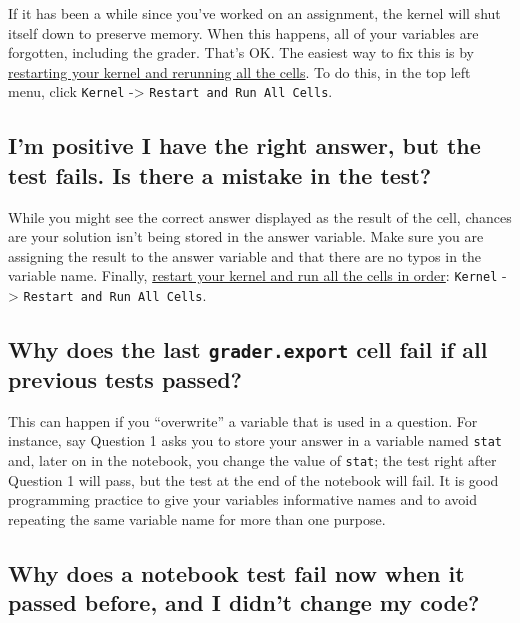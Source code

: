 \documentclass[
  letterpaper,
  DIV=11,
  numbers=noendperiod]{scrreprt}
\begin{document}
If it has been a while since you've worked on an assignment, the kernel
will shut itself down to preserve memory. When this happens, all of your
variables are forgotten, including the grader. That's OK. The easiest
way to fix this is by
\href{https://ds100.org/debugging-guide/jupyter101/jupyter101.html\#restarting-kernel}{restarting
your kernel and rerunning all the cells}. To do this, in the top left
menu, click \texttt{Kernel} -\textgreater{}
\texttt{Restart\ and\ Run\ All\ Cells}.

\subsection{I'm positive I have the right answer, but the test fails. Is
there a mistake in the
test?}\label{im-positive-i-have-the-right-answer-but-the-test-fails.-is-there-a-mistake-in-the-test}

While you might see the correct answer displayed as the result of the
cell, chances are your solution isn't being stored in the answer
variable. Make sure you are assigning the result to the answer variable
and that there are no typos in the variable name. Finally,
\href{https://ds100.org/debugging-guide/jupyter101/jupyter101.html\#restarting-kernel}{restart
your kernel and run all the cells in order}: \texttt{Kernel}
-\textgreater{} \texttt{Restart\ and\ Run\ All\ Cells}.

\subsection{\texorpdfstring{Why does the last \texttt{grader.export}
cell fail if all previous tests
passed?}{Why does the last grader.export cell fail if all previous tests passed?}}\label{why-does-the-last-grader.export-cell-fail-if-all-previous-tests-passed}

This can happen if you ``overwrite'' a variable that is used in a
question. For instance, say Question 1 asks you to store your answer in
a variable named \texttt{stat} and, later on in the notebook, you change
the value of \texttt{stat}; the test right after Question 1 will pass,
but the test at the end of the notebook will fail. It is good
programming practice to give your variables informative names and to
avoid repeating the same variable name for more than one purpose.

\subsection{Why does a notebook test fail now when it passed before, and
I didn't change my
code?}\label{why-does-a-notebook-test-fail-now-when-it-passed-before-and-i-didnt-change-my-code}
\end{document}
